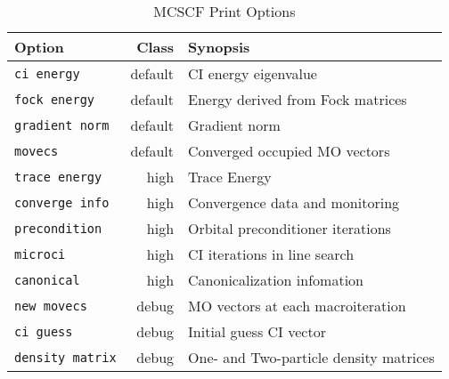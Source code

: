 \begin{table}
\caption{MCSCF Print Options}
\label{MCSCF_print_options}
\vspace{.2in}
\begin{tabular}{lrl}
\hline\hline
Option                          & Class    &  Synopsis \\
\hline
\verb+ci energy+                & default  &  CI energy eigenvalue \\
\verb+fock energy+              & default  &  Energy derived from Fock matrices \\
\verb+gradient norm+            & default  &  Gradient norm \\
\verb+movecs+                   & default  &  Converged occupied MO vectors \\
\verb+trace energy+             & high     &  Trace Energy \\
\verb+converge info+            & high     &  Convergence data and monitoring \\
\verb+precondition+             & high     &  Orbital preconditioner iterations \\
\verb+microci+                  & high     &  CI iterations in line search \\
\verb+canonical+                & high     &  Canonicalization infomation \\
\verb+new movecs+               & debug    &  MO vectors at each macroiteration \\
\verb+ci guess+                 & debug    &  Initial guess CI vector \\
\verb+density matrix+           & debug    &  One- and Two-particle density matrices \\
\hline\hline
\end{tabular}
\end{table}

